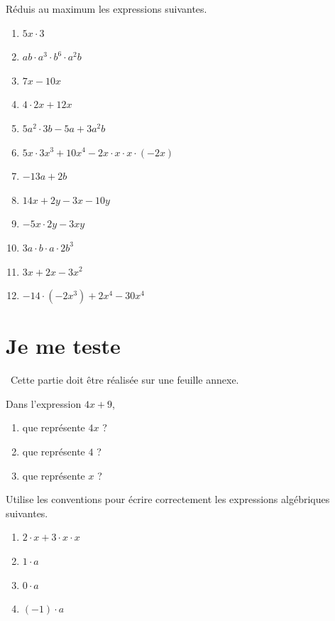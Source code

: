 \documentclass[../../syllabus_1.tex]{subfiles}
\begin{document}
\newpage
\begin{exercise}
    Réduis au maximum les expressions suivantes.
    \begin{enumerate}[cols=2, itemsep=.8cm]
        \item \(5x \cdot 3\)
        \item \(ab\cdot a^3\cdot b^6 \cdot a^2b\)
        \item \(7x-10x\)
        \item \(4\cdot 2x+12x\)
        \item \(5a^2 \cdot 3b - 5a + 3a^2b\)
        \item \(5x \cdot 3x^3 + 10 x^4 - 2x\cdot x \cdot x \cdot (-2x)\)
        \item \(-13a+2b\)
        \item \(14x+2y-3x-10y\)
        \item \(-5x\cdot 2y - 3xy\)
        \item \(3a\cdot b \cdot a \cdot 2b^3\)
        \item \(3x + 2x - 3x^2\)
        \item \(-14\cdot (-2x^3) + 2x^4 - 30x^4\)
    \end{enumerate}
\end{exercise}

\newpage
\section{Je me teste}
~Cette partie doit être réalisée sur une feuille annexe.
\setcounter{exercise}{0}

\begin{exercise}
    Dans l'expression \(4x + 9 \), 
    \begin{enumerate}[cols=3]
        \item que représente \(4x\) ?
        \item que représente $4$ ?
        \item que représente $x$ ?
    \end{enumerate}
\end{exercise}

\begin{exercise}
    Utilise les conventions pour écrire correctement les expressions algébriques suivantes.
    \begin{enumerate}[cols=4]
        \item \(2 \cdot x + 3 \cdot x \cdot x \)
        \item \(1 \cdot a \)
        \item \(0 \cdot a \)
        \item \((-1) \cdot a \)
    \end{enumerate}
\end{exercise}
\end{document}
